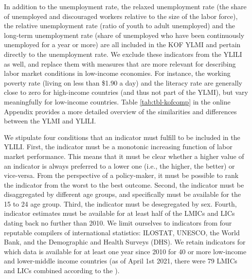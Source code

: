 \documentclass[
  a4paper, twoside, 12pt]{book}
\begin{document}
In addition to the unemployment rate, the relaxed unemployment rate (the share of unemployed and discouraged workers relative to the size of the labor force), the relative unemployment rate (ratio of youth to adult unemployed) and the long-term unemployment rate (share of unemployed who have been continuously unemployed for a year or more) are all included in the KOF YLMI and pertain directly to the unemployment rate. We exclude these indicators from the YLILI as well, and replace them with measures that are more relevant for describing labor market conditions in low-income economies. For instance, the working poverty rate (living on less than \$1.90 a day) and the literacy rate are generally close to zero for high-income countries (and thus not part of the YLMI), but vary meaningfully for low-income countries. Table \ref{tab:tbl-kofcomp} in the online Appendix provides a more detailed overview of the similarities and differences between the YLMI and YLILI.

We stipulate four conditions that an indicator must fulfill to be included in the YLILI. First, the indicator must be a monotonic increasing function of labor market performance. This means that it must be clear whether a higher value of an indicator is always preferred to a lower one (i.e., the higher, the better) or vice-versa. From the perspective of a policy-maker, it must be possible to rank the indicator from the worst to the best outcome. Second, the indicator must be disaggregated by different age groups, and specifically must be available for the 15 to 24 age group. Third, the indicator must be desegregated by sex. Fourth, indicator estimates must be available for at least half of the LMICs and LICs dating back no further than 2010. We limit ourselves to indicators from four reputable compilers of international statistics: ILOSTAT, UNESCO, the World Bank, and the Demographic and Health Surveys (DHS). We retain indicators for which data is available for at least one year since 2010 for 40 or more low-income and lower-middle income countries (as of April 1st 2021, there were 79 LMICs and LICs combined according to the \textcite{worldbank2020a}).
\end{document}
